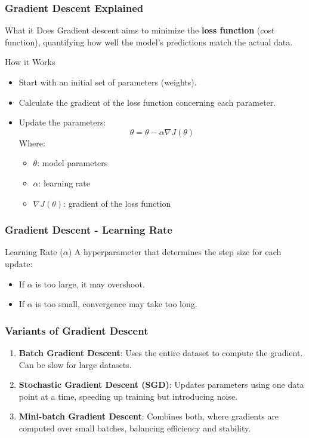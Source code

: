 \documentclass[aspectratio=169]{beamer}
\begin{document}
\begin{frame}
    \frametitle{Gradient Descent Explained}
    \begin{block}{What it Does}
        Gradient descent aims to minimize the \textbf{loss function} (cost function), quantifying how well the model's predictions match the actual data.
    \end{block}
    \begin{block}{How it Works}
        \begin{itemize}
            \item Start with an initial set of parameters (weights).
            \item Calculate the gradient of the loss function concerning each parameter.
            \item Update the parameters: 
            \begin{equation}
                \theta = \theta - \alpha \nabla J(\theta)
            \end{equation}
            Where:
            \begin{itemize}
                \item $\theta$: model parameters
                \item $\alpha$: learning rate
                \item $\nabla J(\theta)$: gradient of the loss function
            \end{itemize}
        \end{itemize}
    \end{block}
\end{frame}

\begin{frame}
    \frametitle{Gradient Descent - Learning Rate}
    \begin{block}{Learning Rate ($\alpha$)}
        A hyperparameter that determines the step size for each update:
        \begin{itemize}
            \item If $\alpha$ is too large, it may overshoot.
            \item If $\alpha$ is too small, convergence may take too long.
        \end{itemize}
    \end{block}
\end{frame}

\begin{frame}
    \frametitle{Variants of Gradient Descent}
    \begin{enumerate}
        \item \textbf{Batch Gradient Descent}: Uses the entire dataset to compute the gradient. Can be slow for large datasets.
        \item \textbf{Stochastic Gradient Descent (SGD)}: Updates parameters using one data point at a time, speeding up training but introducing noise.
        \item \textbf{Mini-batch Gradient Descent}: Combines both, where gradients are computed over small batches, balancing efficiency and stability.
    \end{enumerate}
\end{frame}
\end{document}
